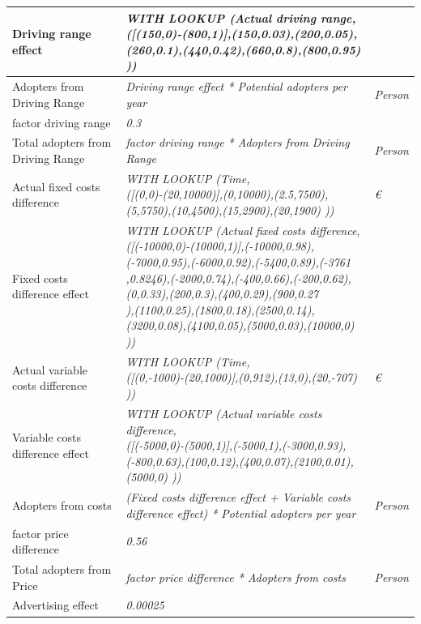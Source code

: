 \begin{table}[!htpb]
\begin{adjustbox}{width=0.96\textwidth}
\begin{tabular}{|l|l|l|}
   Driving range effect & \makecell[l]{\textit{WITH LOOKUP (Actual driving range,} \\ \textit{([(150,0)-(800,1)],(150,0.03),(200,0.05),(260,0.1),(440,0.42),(660,0.8),(800,0.95) ))}} & \\\hline
   Adopters from Driving Range & \textit{Driving range effect * Potential adopters per year} & \textit{Person} \\\hline
   factor driving range & \textit{0.3} & \\\hline
   Total adopters from Driving Range & \textit{factor driving range * Adopters from Driving Range} & \textit{Person} \\\hline
   Actual fixed costs difference & \makecell[l]{\textit{WITH LOOKUP (Time,} \\ \textit{([(0,0)-(20,10000)],(0,10000),(2.5,7500),(5,5750),(10,4500),(15,2900),(20,1900) ))}} & \textit{\euro} \\\hline
   Fixed costs difference effect & \makecell[l]{\textit{WITH LOOKUP (Actual fixed costs difference,} \\ \textit{([(-10000,0)-(10000,1)],(-10000,0.98),(-7000,0.95),(-6000,0.92),(-5400,0.89),(-3761} \\ \textit{,0.8246),(-2000,0.74),(-400,0.66),(-200,0.62),(0,0.33),(200,0.3),(400,0.29),(900,0.27} \\ \textit{),(1100,0.25),(1800,0.18),(2500,0.14),(3200,0.08),(4100,0.05),(5000,0.03),(10000,0) ))}} & \\\hline
   Actual variable costs difference & \makecell[l]{\textit{WITH LOOKUP (Time,} \\ \textit{([(0,-1000)-(20,1000)],(0,912),(13,0),(20,-707) ))}} & \textit{\euro} \\\hline
   Variable costs difference effect & \makecell[l]{\textit{WITH LOOKUP (Actual variable costs difference,} \\ \textit{([(-5000,0)-(5000,1)],(-5000,1),(-3000,0.93),(-800,0.63),(100,0.12),(400,0.07),(2100,0.01),(5000,0) ))}} & \\\hline
   Adopters from costs & \textit{(Fixed costs difference effect + Variable costs difference effect) * Potential adopters per year} & \textit{Person} \\\hline
   factor price difference & \textit{0.56} & \\\hline
   Total adopters from Price & \textit{factor price difference * Adopters from costs} & \textit{Person} \\\hline
   Advertising effect & \textit{0.00025} & \\\hline

\end{tabular}
\end{adjustbox}
\end{table}
